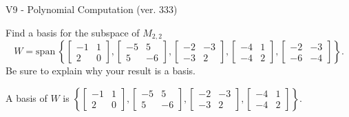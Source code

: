 \begin{exercise}
  \begin{exerciseTitle}V9 - Polynomial Computation (ver. 333)\end{exerciseTitle}
  \begin{exerciseStatement}
    Find a basis for the subspace of \(M_{2,2}\) 
\[W=\mathrm{span}\ \left\{\left[\begin{array}{cc}
-1 & 1 \\
2 & 0
\end{array}\right] , \left[\begin{array}{cc}
-5 & 5 \\
5 & -6
\end{array}\right] , \left[\begin{array}{cc}
-2 & -3 \\
-3 & 2
\end{array}\right] , \left[\begin{array}{cc}
-4 & 1 \\
-4 & 2
\end{array}\right] , \left[\begin{array}{cc}
-2 & -3 \\
-6 & -4
\end{array}\right]\right\}.\]
 Be sure to explain why your result is a basis.


  \end{exerciseStatement}
  \begin{exerciseAnswer}
   A basis of \(W\) is  \(\left\{\left[\begin{array}{cc}
-1 & 1 \\
2 & 0
\end{array}\right] , \left[\begin{array}{cc}
-5 & 5 \\
5 & -6
\end{array}\right] , \left[\begin{array}{cc}
-2 & -3 \\
-3 & 2
\end{array}\right] , \left[\begin{array}{cc}
-4 & 1 \\
-4 & 2
\end{array}\right]\right\}\).
  


  \end{exerciseAnswer}
\end{exercise}